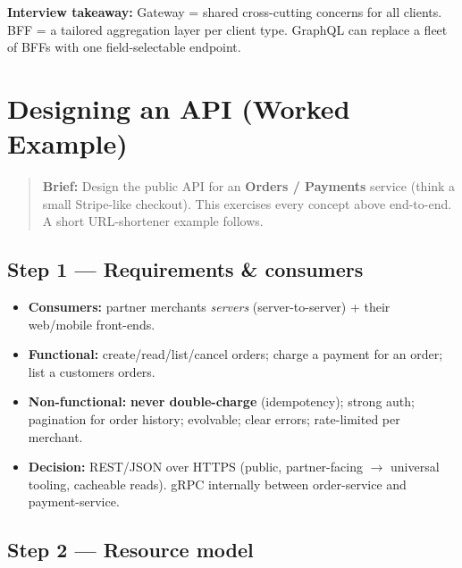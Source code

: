 \documentclass[11pt]{article}
\providecommand{\tightlist}{\setlength{\itemsep}{1pt}\setlength{\parskip}{0pt}}
\begin{document}
\textbf{Interview takeaway:} Gateway = shared cross-cutting concerns for all clients. BFF = a tailored aggregation layer per client type. GraphQL can replace a fleet of BFFs with one field-selectable endpoint.

\section{Designing an API (Worked Example)}\label{designing-an-api-worked-example}

\begin{quote}
\textbf{Brief:} Design the public API for an \textbf{Orders / Payments} service (think a small Stripe-like checkout). This exercises every concept above end-to-end. A short URL-shortener example follows.
\end{quote}

\subsection{Step 1 --- Requirements \& consumers}\label{step-1--requirements--consumers}

\begin{itemize}
\tightlist
\item
  \textbf{Consumers:} partner merchants\textquotesingle{} \emph{servers} (server-to-server) + their web/mobile front-ends.
\item
  \textbf{Functional:} create/read/list/cancel orders; charge a payment for an order; list a customer\textquotesingle s orders.
\item
  \textbf{Non-functional:} \textbf{never double-charge} (idempotency); strong auth; pagination for order history; evolvable; clear errors; rate-limited per merchant.
\item
  \textbf{Decision:} REST/JSON over HTTPS (public, partner-facing \(\rightarrow\) universal tooling, cacheable reads). gRPC internally between order-service and payment-service.
\end{itemize}

\subsection{Step 2 --- Resource model}\label{step-2--resource-model}

\end{document}

